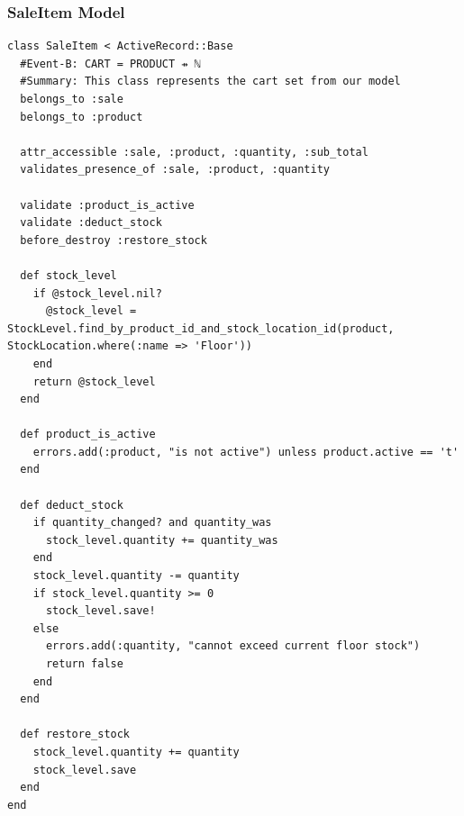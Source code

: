 \documentclass[a4paper]{article}
\begin{document}
\subsubsection{SaleItem Model}
\begin{verbatim}
class SaleItem < ActiveRecord::Base
  #Event-B: CART = PRODUCT ⇸ ℕ
  #Summary: This class represents the cart set from our model
  belongs_to :sale
  belongs_to :product

  attr_accessible :sale, :product, :quantity, :sub_total
  validates_presence_of :sale, :product, :quantity

  validate :product_is_active
  validate :deduct_stock
  before_destroy :restore_stock

  def stock_level
    if @stock_level.nil?
      @stock_level = StockLevel.find_by_product_id_and_stock_location_id(product, StockLocation.where(:name => 'Floor'))
    end
    return @stock_level
  end

  def product_is_active
    errors.add(:product, "is not active") unless product.active == 't'
  end

  def deduct_stock
    if quantity_changed? and quantity_was
      stock_level.quantity += quantity_was
    end
    stock_level.quantity -= quantity
    if stock_level.quantity >= 0
      stock_level.save!
    else
      errors.add(:quantity, "cannot exceed current floor stock")
      return false
    end
  end

  def restore_stock
    stock_level.quantity += quantity
    stock_level.save
  end
end

\end{verbatim}
\end{document}
